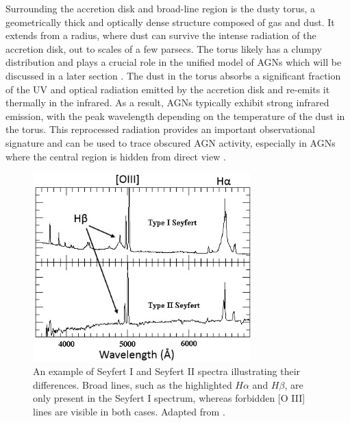 Surrounding the accretion disk and broad-line region is the dusty torus, a geometrically thick and optically dense structure composed of gas and dust. It extends from a radius, where dust can survive the intense radiation of the accretion disk, out to scales of a few parsecs. The torus likely has a clumpy distribution and plays a crucial role in the unified model of AGNs which will be discussed in a later section \parencite{netzer2013agn,hickox2018obscured}.
The dust in the torus absorbs a significant fraction of the UV and optical radiation emitted by the accretion disk and re-emits it thermally in the infrared. As a result, AGNs typically exhibit strong infrared emission, with the peak wavelength depending on the temperature of the dust in the torus. This reprocessed radiation provides an important observational signature and can be used to trace obscured AGN activity, especially in AGNs where the central region is hidden from direct view \parencite{netzer2013agn}.

\begin{figure}[!ht]
	\centering
	\includegraphics[width=0.75\textwidth]{pictures/Chapter2/Syefert1vsSeyfer2}
	\caption{An example of Seyfert I and Seyfert II spectra illustrating their differences. Broad lines, such as the highlighted $H\alpha$ and $H\beta$, are only present in the Seyfert I spectrum, whereas forbidden [O III] lines are visible in both cases. Adapted from \parencite{researchgate_seyfert2025}.}
	
	\label{fig:Seyfert1vsSeyfert2}
\end{figure}




